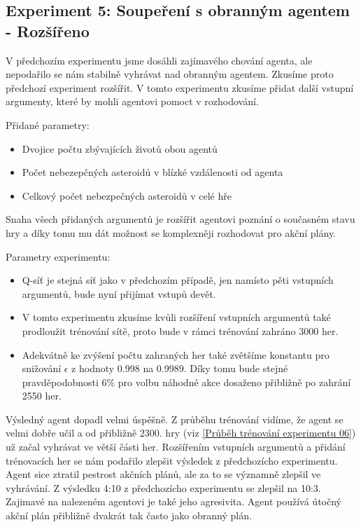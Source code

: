 \newpage
\subsection{Experiment 5: Soupeření s obranným agentem - Rozšířeno}
V předchozím experimentu jsme dosáhli zajímavého chování agenta, ale nepodařilo se nám stabilně vyhrávat nad obranným agentem.
Zkusíme proto předchozí experiment rozšířit. 
V tomto experimentu zkusíme přidat další vstupní argumenty, které by mohli agentovi pomoct v rozhodování.

Přidané parametry:
\begin{itemize}
    \item Dvojice počtu zbývajících životů obou agentů            
    \item Počet nebezepčných asteroidů v blízké vzdálenosti od agenta
    \item Celkový počet nebezpečných asteroidů v celé hře
\end{itemize}
Snaha všech přidaných argumentů je rozšířit agentovi poznání o současném stavu hry a díky tomu mu dát možnost se komplexněji rozhodovat pro akční plány.

Parametry experimentu:
\begin{itemize}
    \item Q-síť je stejná síť jako v předchozím případě, jen namísto pěti vstupních argumentů, bude nyní přijímat vstupů devět.
    \item V tomto experimentu zkusíme kvůli rozšíření vstupních argumentů také prodloužit trénování sítě, proto bude v rámci trénování zahráno 3000 her.
    \item Adekvátně ke zvýšení počtu zahraných her také zvětšíme konstantu pro snižování $\epsilon$ z hodnoty 0.998 na 0.9989. Díky tomu bude stejné pravděpodobnosti 6\% pro volbu náhodné akce dosaženo přibližně po zahrání 2550 her.
\end{itemize}



Výsledný agent dopadl velmi úspěšně. Z průběhu trénování vidíme, že agent se velmi dobře učil a od přibližně 2300. hry (viz \ref{Průběh trénování experimentu 06}) už začal vyhrávat ve větší části her.
Rozšířením vstupních argumentů a přidání trénovacích her se nám podařilo zlepšit výsledek z předchozícho experimentu.
Agent sice ztratil pestrost akčních plánů, ale za to se významně zlepšil ve vyhrávání. Z výsledku 4:10 z předchozícho experimentu se zlepšil na 10:3.
Zajimavé na nalezeném agentovi je také jeho agresivita. Agent používá útočný akční plán přibližně dvakrát tak často jako obranný plán.


